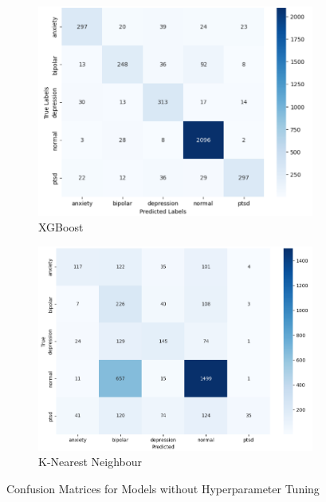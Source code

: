 \begin{figure}[h!]
\begin{subfigure}[b]{0.49\textwidth}
        \centering
        \includegraphics[width=\textwidth]{Images/XG Confusion Matrix.png}
        \caption*{XGBoost}
        \label{XGCM}  %
    \end{subfigure}
    \hfill
    \begin{subfigure}[b]{0.49\textwidth}
        \centering
        \includegraphics[width=\textwidth]{Images/KNN Confusion Matrix.png}
        \caption*{K-Nearest Neighbour}
        \label{KNNCM}  %
    \end{subfigure}
    \hfill

    \label{fig:comparison}
    \caption*{Confusion Matrices for Models without Hyperparameter Tuning}
\end{figure}

